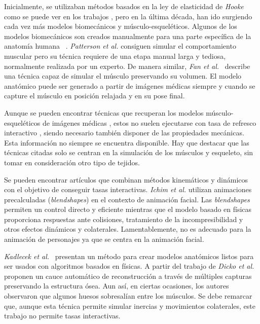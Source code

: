 Inicialmente, se utilizaban métodos basados en la ley de elasticidad de \emph{Hooke} como se puede ver en los trabajos \cite{russell93,wilhelms1995modeling}, pero en la última década, han ido surgiendo cada vez más modelos biomecánicos y músculo-esqueléticos. Algunos de los modelos biomecánicos son creados manualmente para una parte específica de la anatomía humana ~\cite{Lee2009}. \emph{Patterson et al.} \cite{Patterson2012} consiguen simular el comportamiento muscular pero su técnica requiere de una etapa manual larga y tediosa, normalmente realizada por un experto. De manera similar, \emph{Fan et al.}~ \cite{Fan2014} describe una técnica capaz de simular el músculo preservando su volumen. El modelo anatómico puede ser generado a partir de imágenes médicas siempre y cuando se capture el músculo en posición relajada y en su pose final. 

Aunque se pueden encontrar técnicas que recuperan los modelos músculo-esqueléticos de imágenes médicas \cite{blemker2007, gilles2010, schmid2009}, estos no suelen ejecutarse con tasa de refresco interactivo%
, siendo necesario también disponer de las propiedades mecánicas. Esta información no siempre se encuentra disponible. Hay que destacar que las técnicas citadas solo se centran en la simulación de los músculos y esqueleto, sin tomar en consideración otro tipo de tejidos.

Se pueden encontrar artículos que combinan métodos kinemáticos y dinámicos con el objetivo de conseguir tasas interactivas.  \emph{Ichim et al.} \cite{Ichim:2016} utilizan animaciones precalculadas (\emph{blendshapes}) en el contexto de animación facial. Las \emph{blendshapes} permiten un control directo y eficiente mientras que el modelo basado en físicas proporciona respuestas ante colisiones, tratamiento de la incompresibilidad y otros efectos dinámicos y colaterales. Lamentablemente, no es adecuado para la animación de personajes ya que se centra en la animación facial. 


\emph{Kadlecek et al.}~\cite{kadlecek-16-reconstructing} presentan un método para crear modelos anatómicos listos para ser usados con algoritmos basados en físicas. A partir del trabajo de \emph{Dicko et al.} \cite{Ali2013} proponen un cauce automático de reconstrucción a través de múltiples capturas preservando la estructura ósea. Aun así, en ciertas ocasiones, los autores observaron que algunos huesos sobresalían entre los músculos. Se debe remarcar que, aunque esta técnica permite simular inercias y movimientos colaterales, este trabajo no permite tasas interactivas.   %


